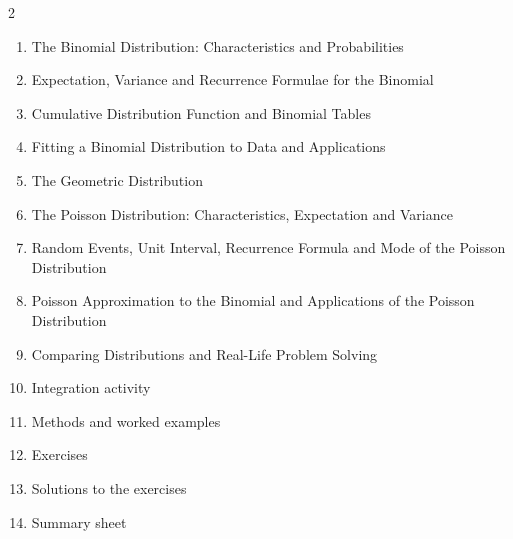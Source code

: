 \documentclass[11pt]{article}
\begin{document}
\begin{sommaire}
\begin{multicols}{2}
\begin{enumerate}
\item The Binomial Distribution: Characteristics and Probabilities
\item Expectation, Variance and Recurrence Formulae for the Binomial
\item Cumulative Distribution Function and Binomial Tables
\item Fitting a Binomial Distribution to Data and Applications
\item The Geometric Distribution
\item The Poisson Distribution: Characteristics, Expectation and Variance
\item Random Events, Unit Interval, Recurrence Formula and Mode of the Poisson Distribution
\item Poisson Approximation to the Binomial and Applications of the Poisson Distribution
\item Comparing Distributions and Real-Life Problem Solving
\item Integration activity
\item Methods and worked examples
\item Exercises
\item Solutions to the exercises
\item Summary sheet
\end{enumerate}
\end{multicols}
\end{sommaire}
\end{document}
